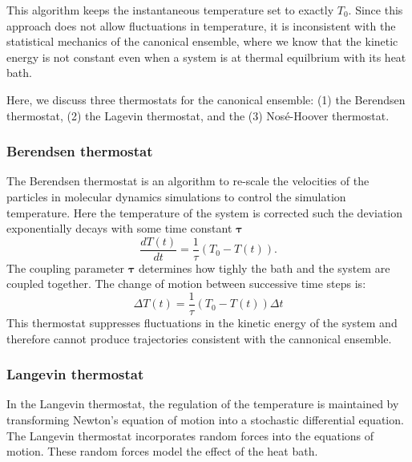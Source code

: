 This algorithm keeps the instantaneous temperature set to exactly $T_0$.  Since this approach does not allow fluctuations in temperature, it is inconsistent with the statistical mechanics of the canonical ensemble, where we know that the kinetic energy is not constant even when a system is at thermal equilbrium with its heat bath.

Here, we discuss three thermostats for the canonical ensemble: (1) the Berendsen thermostat, (2) the Lagevin thermostat, and the (3) Nos\'e-Hoover thermostat.

\subsubsection{Berendsen thermostat}

The Berendsen thermostat\cite{berendsen1984_nvt} is an algorithm to re-scale the velocities of the particles in molecular dynamics simulations to control the simulation temperature.  Here the temperature of the system is corrected such the deviation exponentially decays with some time constant $\bm{\tau}$
\begin{equation}
  \label{eq:npt_berendsen_1}
  \frac{dT(t)}{dt} = \frac{1}{\tau} (T_0 - T(t)).
\end{equation}
The coupling parameter $\bm{\tau}$ determines how tighly the bath and the system are coupled together.  The change of motion between successive time steps is:
\begin{equation}
  \label{eq:npt_berendsen_2}
  \Delta T(t) = \frac{1}{\tau} (T_0 - T(t)) \Delta t
\end{equation}
This thermostat suppresses fluctuations in the kinetic energy of the system and therefore cannot produce trajectories consistent with the cannonical ensemble.

\subsubsection{Langevin thermostat}

In the Langevin thermostat\cite{allen1987_md}, the regulation of the temperature is maintained by transforming Newton's equation of motion into a stochastic differential equation.
The Langevin thermostat incorporates random forces into the equations of motion.  These random forces model the effect of the heat bath.

